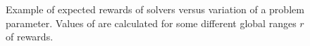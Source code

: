 \begin{figure}[tbp]
    \caption{Example of expected rewards of solvers versus variation of a problem parameter. Values of \xQ{} are calculated for some different global ranges $r$ of rewards.}
    \label{fig:sq_thry2}
\end{figure}
